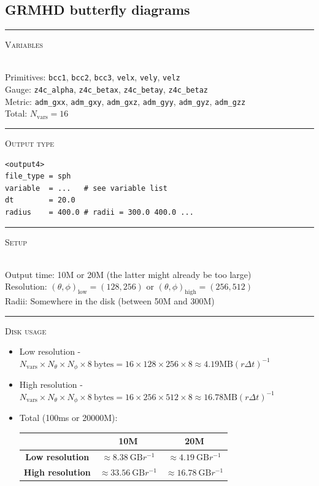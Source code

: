 \documentclass{article}
\newcommand{\var}[1]{%
  {\setlength{\fboxsep}{1.5pt}%
   \colorbox{varbg}{\textcolor{varfg}{\texttt{\small #1}}}}}
\newcommand{\step}[1]{%
  \par\medskip\noindent
  {\color{stepfg}\rule[-0.15ex]{2pt}{1.5ex}\hspace{0.5em}\scshape #1}%
  \hspace{0.75em}\ignorespaces}
\begin{document}
\subsection*{GRMHD butterfly diagrams}
\step{Variables}\mbox{}\\
Primitives: \var{bcc1}, \var{bcc2}, \var{bcc3}, \var{velx}, \var{vely}, \var{velz}\\
Gauge: \var{z4c\_alpha}, \var{z4c\_betax}, \var{z4c\_betay}, \var{z4c\_betaz}\\
Metric: \var{adm\_gxx}, \var{adm\_gxy}, \var{adm\_gxz}, \var{adm\_gyy}, \var{adm\_gyz}, \var{adm\_gzz}\\
Total: $\boxed{N_{\mathrm{vars}}=16}$

\step{Output type}
\begin{verbatim}
<output4>
file_type = sph
variable  = ...   # see variable list
dt        = 20.0
radius    = 400.0 # radii = 300.0 400.0 ...
\end{verbatim}

\step{Setup}\mbox{}\\
Output time: 10M or 20M (the latter might already be too large)\\
Resolution: $(\theta,\phi)_{\mathrm{low}}=(128,256)$ or  $(\theta,\phi)_{\mathrm{high}}=(256,512)$\\
Radii: Somewhere in the disk (between 50M and 300M)

\step{Disk usage}
\begin{itemize}
  \item Low resolution - $N_{\mathrm{vars}}\times N_{\theta}\times N_{\phi}\times 8\ \mathrm{bytes}=16\times128\times256\times8\approx \boxed{4.19\mathrm{MB}(r\Delta t)^{-1}}$
  \item High resolution - $N_{\mathrm{vars}}\times N_{\theta}\times N_{\phi}\times 8\ \mathrm{bytes}=16\times256\times512\times8\approx \boxed{16.78\mathrm{MB}(r\Delta t)^{-1}}$
  \item Total (100ms or 20000M):
  \begin{raggedleft}
    \begin{tabular}{|c|c|c|}
      \hline
      &\textbf{10M}&\textbf{20M}\\
      \hline
      \textbf{Low resolution}&$\approx 8.38\ \mathrm{GB}r^{-1}$&$\approx 4.19\ \mathrm{GB}r^{-1}$\\
      \hline
      \textbf{High resolution}&$\approx 33.56\ \mathrm{GB}r^{-1}$&$\approx 16.78\ \mathrm{GB}r^{-1}$\\
      \hline
    \end{tabular}
  \end{raggedleft}
\end{itemize}
\end{document}
